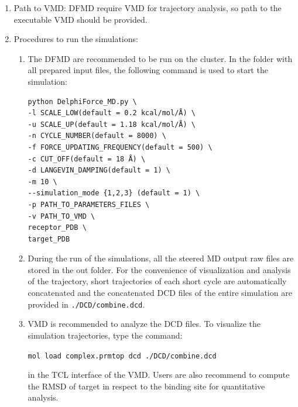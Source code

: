 \documentclass[9pt,tutorial]{livecoms}
\begin{document}
\begin{enumerate}
\item Path to VMD: DFMD require VMD for trajectory analysis, so path to the executable VMD should be provided.
\item 
Procedures to run the simulations:
\begin{enumerate}
\item The DFMD are recommended to be run on the cluster.  In the folder with all prepared input files, the following command is used to start the simulation:

\begin{verbatim}
python DelphiForce_MD.py \
-l SCALE_LOW(default = 0.2 kcal/mol/Å) \
-u SCALE_UP(default = 1.18 kcal/mol/Å) \
-n CYCLE_NUMBER(default = 8000) \
-f FORCE_UPDATING_FREQUENCY(default = 500) \
-c CUT_OFF(default = 18 Å) \
-d LANGEVIN_DAMPING(default = 1) \
-m 10 \
--simulation_mode {1,2,3} (default = 1) \
-p PATH_TO_PARAMETERS_FILES \
-v PATH_TO_VMD \
receptor_PDB \
target_PDB
\end{verbatim}

\item During the run of the simulations, all the steered MD output raw files are stored in the out folder. For the convenience of visualization and analysis of the trajectory, short trajectories of each short cycle are automatically concatenated and the concatenated DCD files of the entire simulation are provided in \texttt{./DCD/combine.dcd}.
\item VMD is recommended to analyze the DCD files. To visualize the simulation trajectories, type the command:

\texttt{mol load complex.prmtop dcd ./DCD/combine.dcd}

in the TCL interface of the VMD. Users are also recommend to compute the RMSD of target in respect to the binding site for quantitative analysis.
\end{enumerate}
\end{enumerate}
\end{document}

